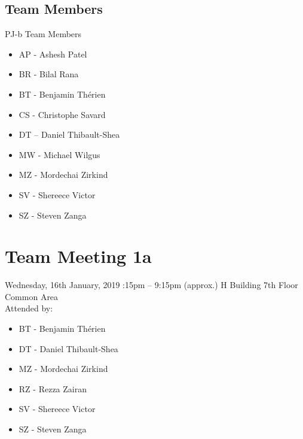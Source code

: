 \documentclass[12pt]{article}
\begin{document}
\subsection{Team Members}

PJ-b Team Members
\begin{itemize}
	\item AP - Ashesh Patel 
	\item BR - Bilal Rana
	\item BT - Benjamin Th\'erien
	\item CS - Christophe Savard
	\item DT – Daniel Thibault-Shea
	\item MW - Michael Wilgus
	\item MZ - Mordechai Zirkind
	\item SV - Shereece  Victor
	\item SZ - Steven Zanga
\end{itemize}
 

\pagebreak
\section{Team Meeting 1a }

Wednesday, 16th January, 2019 :15pm – 9:15pm (approx.) \textbar H Building 7th Floor Common Area \\

Attended by: 

 \begin{itemize}
 	\item BT - Benjamin Th\'erien 
 	\item DT - Daniel Thibault-Shea 
 	\item MZ - Mordechai Zirkind 
 	\item RZ - Rezza Zairan 
 	\item SV - Shereece Victor 
 	\item SZ - Steven Zanga
 	
 \end{itemize}
\end{document}
